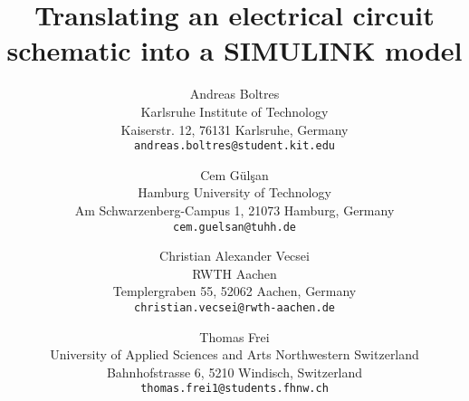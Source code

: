 \documentclass[10pt,twocolumn,letterpaper]{article}
\begin{document}
\title{Translating an electrical circuit schematic into a SIMULINK model}

\author{Andreas Boltres\\
Karlsruhe Institute of Technology\\
Kaiserstr. 12, 76131 Karlsruhe, Germany\\
{\tt\small andreas.boltres@student.kit.edu}
\and
Cem G\"ul\c{s}an\\
Hamburg University of Technology\\
Am Schwarzenberg-Campus 1, 21073 Hamburg, Germany\\
{\tt\small cem.guelsan@tuhh.de}
\and
Christian Alexander Vecsei\\
RWTH Aachen\\
Templergraben 55, 52062 Aachen, Germany\\
{\tt\small christian.vecsei@rwth-aachen.de}
\and
Thomas Frei\\
University of Applied Sciences and Arts Northwestern Switzerland\\
Bahnhofstrasse 6, 5210 Windisch, Switzerland\\
{\tt\small thomas.frei1@students.fhnw.ch}
}

\maketitle





\begin{table}[H]
\end{table}
\end{document}
